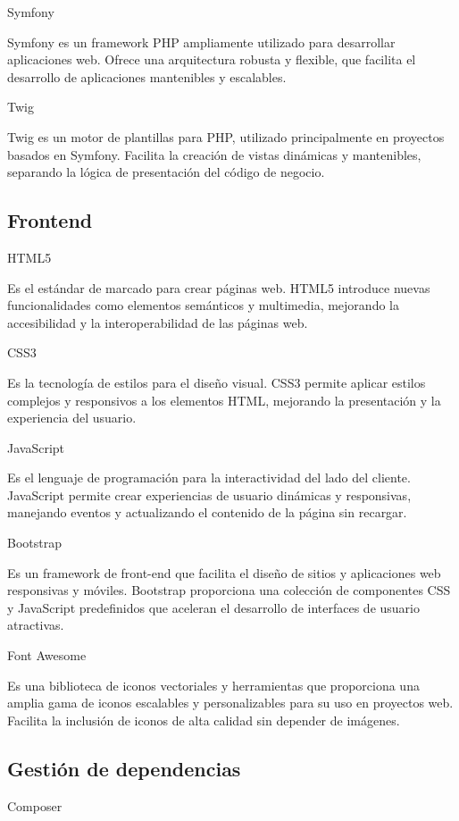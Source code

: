 Symfony

Symfony es un framework PHP ampliamente utilizado para desarrollar aplicaciones web.
Ofrece una arquitectura robusta y flexible, que facilita el desarrollo de aplicaciones mantenibles y escalables.

Twig

Twig es un motor de plantillas para PHP, utilizado principalmente en proyectos basados en
Symfony.
Facilita la creación de vistas dinámicas y mantenibles, separando la lógica de presentación del código de negocio.

\subsection*{Frontend}

HTML5

Es el estándar de marcado para crear páginas web.
HTML5 introduce nuevas funcionalidades como elementos semánticos y multimedia, mejorando la accesibilidad y la
interoperabilidad de las páginas web.

CSS3

Es la tecnología de estilos para el diseño visual.
CSS3 permite aplicar estilos complejos y responsivos a los elementos HTML, mejorando la presentación y la experiencia
del usuario.

JavaScript

Es el lenguaje de programación para la interactividad del lado del cliente.
JavaScript permite crear experiencias de usuario dinámicas y responsivas, manejando eventos y actualizando el contenido
de la página sin recargar.

Bootstrap

Es un framework de front-end que facilita el diseño de sitios y aplicaciones web
responsivas y móviles.
Bootstrap proporciona una colección de componentes CSS
y JavaScript predefinidos que aceleran el desarrollo de interfaces de usuario atractivas.

Font Awesome

Es una biblioteca de iconos vectoriales y herramientas que proporciona una amplia gama de
iconos escalables y personalizables para su uso en proyectos web.
Facilita la inclusión de iconos de alta calidad sin depender de imágenes.

\subsection*{Gestión de dependencias}

Composer

